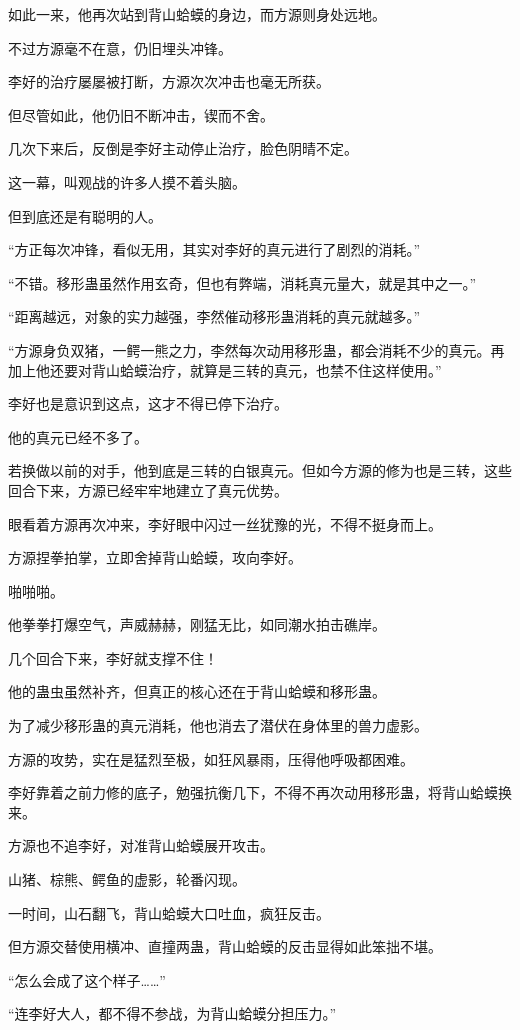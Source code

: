 \begin{this_body}
如此一来，他再次站到背山蛤蟆的身边，而方源则身处远地。

不过方源毫不在意，仍旧埋头冲锋。

李好的治疗屡屡被打断，方源次次冲击也毫无所获。

但尽管如此，他仍旧不断冲击，锲而不舍。

几次下来后，反倒是李好主动停止治疗，脸色阴晴不定。

这一幕，叫观战的许多人摸不着头脑。

但到底还是有聪明的人。

“方正每次冲锋，看似无用，其实对李好的真元进行了剧烈的消耗。”

“不错。移形蛊虽然作用玄奇，但也有弊端，消耗真元量大，就是其中之一。”

“距离越远，对象的实力越强，李然催动移形蛊消耗的真元就越多。”

“方源身负双猪，一鳄一熊之力，李然每次动用移形蛊，都会消耗不少的真元。再加上他还要对背山蛤蟆治疗，就算是三转的真元，也禁不住这样使用。”

李好也是意识到这点，这才不得已停下治疗。

他的真元已经不多了。

若换做以前的对手，他到底是三转的白银真元。但如今方源的修为也是三转，这些回合下来，方源已经牢牢地建立了真元优势。

眼看着方源再次冲来，李好眼中闪过一丝犹豫的光，不得不挺身而上。

方源捏拳拍掌，立即舍掉背山蛤蟆，攻向李好。

啪啪啪。

他拳拳打爆空气，声威赫赫，刚猛无比，如同潮水拍击礁岸。

几个回合下来，李好就支撑不住！

他的蛊虫虽然补齐，但真正的核心还在于背山蛤蟆和移形蛊。

为了减少移形蛊的真元消耗，他也消去了潜伏在身体里的兽力虚影。

方源的攻势，实在是猛烈至极，如狂风暴雨，压得他呼吸都困难。

李好靠着之前力修的底子，勉强抗衡几下，不得不再次动用移形蛊，将背山蛤蟆换来。

方源也不追李好，对准背山蛤蟆展开攻击。

山猪、棕熊、鳄鱼的虚影，轮番闪现。

一时间，山石翻飞，背山蛤蟆大口吐血，疯狂反击。

但方源交替使用横冲、直撞两蛊，背山蛤蟆的反击显得如此笨拙不堪。

“怎么会成了这个样子……”

“连李好大人，都不得不参战，为背山蛤蟆分担压力。”


\end{this_body}
